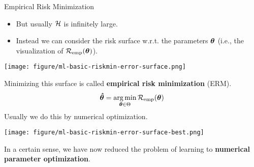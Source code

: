 \documentclass[11pt,compress,t,notes=noshow, xcolor=table]{beamer}
\begin{document}
\begin{vbframe}{Empirical Risk Minimization}

\begin{itemize}

    \item But usually $\mathcal{H}$ is infinitely large. 
    \item Instead we can consider the risk surface w.r.t. the parameters $\bm{\theta}$ (i.e., the visualization of $\mathcal{R}_{\text{emp}}(\bm{\theta})$).
\end{itemize}

{
\texttt{[image: figure/ml-basic-riskmin-error-surface.png]}
}

\framebreak

Minimizing this surface is called \textbf{empirical risk minimization} (ERM).
$$
\bm{\hat\theta} = \mathop{\mathrm{arg\,min}}_{\bm{\theta} \in \Theta} \mathcal{R}_{\text{emp}}(\bm{\theta})
$$
Usually we do this by numerical optimization.

{
\vspace{2em}
\texttt{[image: figure/ml-basic-riskmin-error-surface-best.png]}
}

In a certain sense, we have now reduced the problem of learning to 
\textbf{numerical parameter optimization}.

\end{vbframe}

\endlecture
\end{document}
